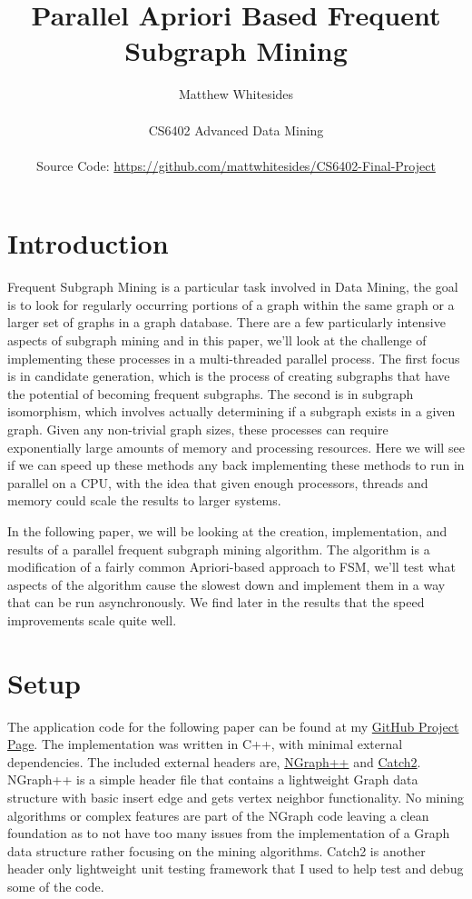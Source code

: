 \documentclass{article}
\title{Parallel Apriori Based Frequent Subgraph Mining}
\author{Matthew Whitesides\\\\
  \large CS6402 Advanced Data Mining\\\\
  \large Source Code: \href{https://github.com/mattwhitesides/CS6402-Final-Project}{https://github.com/mattwhitesides/CS6402-Final-Project}}
\begin{document}
\maketitle

\section{Introduction}
Frequent Subgraph Mining is a particular task involved in Data Mining, the goal is to look for regularly occurring portions of a graph within the same graph or a larger set of graphs in a graph database. There are a few particularly intensive aspects of subgraph mining and in this paper, we'll look at the challenge of implementing these processes in a multi-threaded parallel process. The first focus is in candidate generation, which is the process of creating subgraphs that have the potential of becoming frequent subgraphs. The second is in subgraph isomorphism, which involves actually determining if a subgraph exists in a given graph. Given any non-trivial graph sizes, these processes can require exponentially large amounts of memory and processing resources. Here we will see if we can speed up these methods any back implementing these methods to run in parallel on a CPU, with the idea that given enough processors, threads and memory could scale the results to larger systems. 

In the following paper, we will be looking at the creation, implementation, and results of a parallel frequent subgraph mining algorithm. The algorithm is a modification of a fairly common Apriori-based approach to FSM, we'll test what aspects of the algorithm cause the slowest down and implement them in a way that can be run asynchronously. We find later in the results that the speed improvements scale quite well. 

\section{Setup}
The application code for the following paper can be found at my \href{https://github.com/mattwhitesides/CS6402-Final-Project}{GitHub Project Page}. The implementation was written in C++, with minimal external dependencies. The included external headers are, \href{https://github.com/NervanaSystems/ngraph}{NGraph++} and \href{https://github.com/catching/Catch2}{Catch2}. NGraph++ is a simple header file that contains a lightweight Graph data structure with basic insert edge and gets vertex neighbor functionality. No mining algorithms or complex features are part of the NGraph code leaving a clean foundation as to not have too many issues from the implementation of a Graph data structure rather focusing on the mining algorithms. Catch2 is another header only lightweight unit testing framework that I used to help test and debug some of the code.
\end{document}
